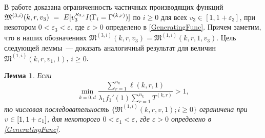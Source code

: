 \documentclass[a4paper,twoside]{article}
\theoremstyle{theorem}
\newtheorem{lemma}{Лемма}
\theoremstyle{remark}
\renewcommand*{\hm}[1]{#1\nobreak\discretionary{}%
	{\hbox{$\mathsurround=0pt #1$}}{}}%
\begin{document}
В работе \cite{Kocheganov:2017:1} доказана ограниченность частичных производящих функций $\mathfrak{M}^{(3,i)}(k,r,v_3)~\hm= ~E[v_3^{\varkappa_{3,i}}{I(\Gamma_{i}=\Gamma^{(k,r)})}]$ по $i\geqslant 0$ для всех $v_3\in [1,1+\varepsilon_3]$, при некотором $0 < \varepsilon_3 < \varepsilon$, где $\varepsilon>0$ определено в \eqref{GeneratingFunc}. Причем заметим, что в наших обозначениях $\mathfrak{M}^{(3,i)}(k,r,v_3) =\mathfrak{M}^{(1,i)}(k,r,1,v_3) $. Цель следующей леммы~--- доказать аналогичный результат для величин $\mathfrak{M}^{(1,i)}(k,r,v_1,1)$, $i\geqslant 0$.
\begin{lemma}
Если 
$$
\min_{k=\overline{0,d}} { \frac{\sum_{r = 1}^{n_k} \ell(k,r,1) }{\lambda_1 f_1'(1) \sum_{r=1}^{n_k} T^{(k,r)} }}>1,
$$
то числовая последовательность $\{\mathfrak{M}^{(1,i)}(k,r,v,1); i\geqslant 0\}$ ограничена при $v \hm\in [1, 1+\varepsilon_1]$, для некоторого $ 0 < \varepsilon_1 < \varepsilon$, где $\varepsilon>0$ определено в \eqref{GeneratingFunc}.
\label{generating:1:limited}
\end{lemma}
\end{document}
